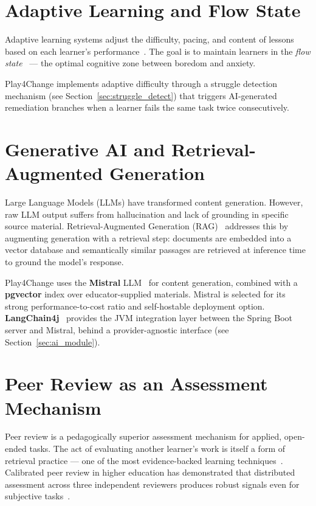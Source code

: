 \section{Adaptive Learning and Flow State}
\label{sec:adaptive}

Adaptive learning systems adjust the difficulty, pacing, and content of lessons based on each learner's performance~\cite{vanlehn2011relative}. The goal is to maintain learners in the \emph{flow state}~\cite{csikszentmihalyi1990flow} — the optimal cognitive zone between boredom and anxiety.

Play4Change implements adaptive difficulty through a struggle detection mechanism (see Section~\ref{sec:struggle_detect}) that triggers AI-generated remediation branches when a learner fails the same task twice consecutively.

\section{Generative AI and Retrieval-Augmented Generation}
\label{sec:genai}

Large Language Models (LLMs) have transformed content generation. However, raw LLM output suffers from hallucination and lack of grounding in specific source material. Retrieval-Augmented Generation (RAG)~\cite{lewis2020retrieval} addresses this by augmenting generation with a retrieval step: documents are embedded into a vector database and semantically similar passages are retrieved at inference time to ground the model's response.

Play4Change uses the \textbf{Mistral} LLM~\cite{mistral2024} for content generation, combined with a \textbf{pgvector} index over educator-supplied materials. Mistral is selected for its strong performance-to-cost ratio and self-hostable deployment option. \textbf{LangChain4j}~\cite{langchain4j2024} provides the JVM integration layer between the Spring Boot server and Mistral, behind a provider-agnostic interface (see Section~\ref{sec:ai_module}).

\section{Peer Review as an Assessment Mechanism}
\label{sec:peer_review_bg}

Peer review is a pedagogically superior assessment mechanism for applied, open-ended tasks. The act of evaluating another learner's work is itself a form of retrieval practice — one of the most evidence-backed learning techniques~\cite{roediger2011retrieval}. Calibrated peer review in higher education has demonstrated that distributed assessment across three independent reviewers produces robust signals even for subjective tasks~\cite{reily2010two}.

